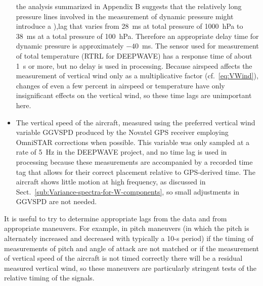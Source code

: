 \documentclass[12pt,twoside,english]{article}\usepackage[]{graphicx}\usepackage[]{color}
\let\OrgIndex\index
\renewcommand*{\index}[1]{\OrgIndex{#1}}
\begin{document}
\begin{itemize}
the analysis summarized in Appendix B suggests that the relatively long pressure lines involved in the measurement of dynamic pressure might introduce a
),lag that varies from 28~ms at total pressure of 1000~hPa to 38~ms at a total pressure of 100~hPa. Therefore an appropriate delay time for dynamic pressure is approximately $-40$~ms. The sensor used for measurement of total temperature (RTRL for DEEPWAVE) has a response time of about 1~s or more, but no delay is used in processing. Because airspeed affects the measurement of vertical wind only as a multiplicative factor (cf.~\eqref{eq:VWind}), changes of even a few percent in airspeed or temperature have only insignificant effects on the vertical wind, so these time lags are unimportant here.
\item The vertical speed of the aircraft, measured using the preferred vertical wind variable GGVSPD produced by the Novatel GPS receiver employing OmniSTAR corrections when possible. This variable was only sampled at a rate of 5~Hz in the DEEPWAVE project, and no time lag is used in processing because these measurements are accompanied by a recorded time tag that allows for their correct placement relative to GPS-derived time. The aircraft shows little motion at high frequency, as discussed in Sect.~\ref{sub:Variance-spectra-for-W-components}, so small adjustments in GGVSPD are not needed.

\end{itemize}
It is useful to try to determine appropriate lags from the data and from appropriate maneuvers. For example, in pitch maneuvers (in which the pitch is alternately increased and decreased with typically a 10-s period) if the timing of measurements of pitch and angle of attack are not matched or if the measurement of vertical speed of the aircraft is not timed correctly there will be a residual measured vertical wind, so these maneuvers are particularly stringent tests of the relative timing of the signals.
\end{document}
